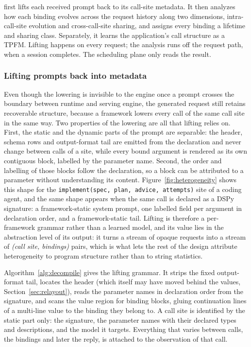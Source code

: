 \sysname first lifts each received prompt back to its call-site metadata. It then analyzes how each binding evolves across the request history along two dimensions, intra-call-site evolution and cross-call-site sharing, and assigns every binding a lifetime and sharing class. Separately, it learns the application's call structure as a TPFM. Lifting happens on every request; the analysis runs off the request path, when a session completes. The scheduling plane only reads the result.

\subsubsection{Lifting prompts back into metadata}
\label{sec:lifting}

Even though the lowering is invisible to the engine once a prompt crosses the boundary between runtime and serving engine, the generated request still retains recoverable structure, because a framework lowers every call of the same call site in the same way. Two properties of the lowering are all that lifting relies on. First, the static and the dynamic parts of the prompt are separable: the header, schema rows and output-format tail are emitted from the declaration and never change between calls of a site, while every bound argument is rendered as its own contiguous block, labelled by the parameter name. Second, the order and labelling of those blocks follow the declaration, so a block can be attributed to a parameter without understanding its content. Figure~\ref{fig:heterogeneity} shows this shape for the \texttt{implement(spec, plan, advice, attempts)} site of a coding agent, and the same shape appears when the same call is declared as a DSPy signature: a framework-static system prompt, one labelled field per argument in declaration order, and a framework-static tail. Lifting is therefore a per-framework grammar rather than a learned model, and its value lies in the abstraction level of its output: it turns a stream of opaque requests into a stream of \emph{(call site, bindings)} pairs, which is what lets the rest of the design attribute heterogeneity to program structure rather than to string statistics.

Algorithm~\ref{alg:decompile} gives the lifting grammar. It strips the fixed output-format tail, locates the header (which \sysname itself may have moved behind the values, Section~\ref{sec:relayout}), reads the parameter names in declaration order from the signature, and scans the value region for binding blocks, gluing continuation lines of a multi-line value to the binding they belong to. A call site is identified by the static part only: the signature, the parameter names with their declared types and descriptions, and the model it targets. Everything that varies between calls, the bindings and later the reply, is attached to the observation of that call.

